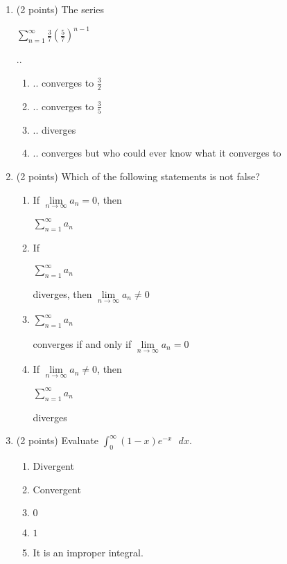 \documentclass[paper=a4, fontsize=11pt]{scrartcl} %
\numberwithin{equation}{section} %
\numberwithin{figure}{section} %
\numberwithin{table}{section} %
\begin{document}
\begin{enumerate}
\item (2 points) The series \begin{large}$\sum\limits_{n=1}^\infty \frac{3}{7} \left( \frac{5}{7} \right)^{n-1}$ \end{large} ..
\vspace{2mm}
 \normalsize \begin{enumerate}
    \item .. converges to $\frac{3}{2}$
    \item .. converges to $\frac{3}{5}$
    \item .. diverges
    \item .. converges but who could ever know what it converges to
  \end{enumerate}
\item (2 points) Which of the following statements is not false?
\normalsize \begin{enumerate}
    \item If $\lim\limits_{n \rightarrow \infty} a_n = 0$, then  \begin{large}$\sum\limits_{n=1}^\infty a_n$ \end{large}
    \item If \begin{large}$\sum\limits_{n=1}^\infty a_n$ \end{large} diverges,  then $\lim\limits_{n \rightarrow \infty} a_n \neq 0$
    \item \begin{large}$\sum\limits_{n=1}^\infty a_n$ \end{large} converges if and only if $\lim\limits_{n \rightarrow \infty} a_n = 0$
    \item If $\lim\limits_{n \rightarrow \infty} a_n \neq 0$, then \begin{large}$\sum\limits_{n=1}^\infty a_n$ \end{large} diverges
  \end{enumerate}
\item (2 points) Evaluate \large$\int_0^{\infty}(1-x)e^{-x}\text{  }dx$.
\vspace{2mm}
 \normalsize \begin{enumerate}
    \item Divergent
    \item Convergent
    \item $0$
    \item $1$
    \item It is an improper integral.
  \end{enumerate}


\end{enumerate}
\end{document}
